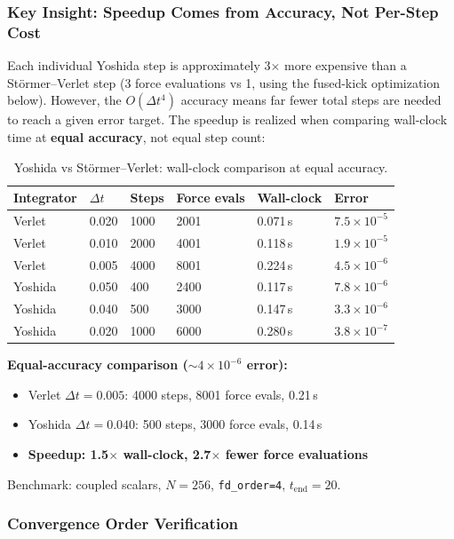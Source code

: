 \subsubsection{Key Insight: Speedup Comes from Accuracy, Not Per-Step Cost}
\label{sec:yoshida-speedup}

Each individual Yoshida step is approximately 3$\times$ more expensive than a
St\"ormer--Verlet step (3 force evaluations vs 1, using the fused-kick
optimization below). However, the $O(\Delta t^4)$ accuracy means far fewer total
steps are needed to reach a given error target. The speedup is realized
when comparing wall-clock time at \textbf{equal accuracy}, not equal step count:

\begin{table}[htbp]
\centering
\caption{Yoshida vs St\"ormer--Verlet: wall-clock comparison at equal accuracy.}
\label{tab:yoshida-benchmark}
\begin{tabular}{@{}llllll@{}}
\toprule
Integrator & $\Delta t$ & Steps & Force evals & Wall-clock & Error \\
\midrule
Verlet & 0.020 & 1000 & 2001 & 0.071\,s & $7.5 \times 10^{-5}$ \\
Verlet & 0.010 & 2000 & 4001 & 0.118\,s & $1.9 \times 10^{-5}$ \\
Verlet & 0.005 & 4000 & 8001 & 0.224\,s & $4.5 \times 10^{-6}$ \\
Yoshida & 0.050 & 400 & 2400 & 0.117\,s & $7.8 \times 10^{-6}$ \\
Yoshida & 0.040 & 500 & 3000 & 0.147\,s & $3.3 \times 10^{-6}$ \\
Yoshida & 0.020 & 1000 & 6000 & 0.280\,s & $3.8 \times 10^{-7}$ \\
\bottomrule
\end{tabular}
\end{table}

\textbf{Equal-accuracy comparison ($\sim 4 \times 10^{-6}$ error):}
\begin{itemize}
  \item Verlet $\Delta t=0.005$: 4000 steps, 8001 force evals, 0.21\,s
  \item Yoshida $\Delta t=0.040$: 500 steps, 3000 force evals, 0.14\,s
  \item \textbf{Speedup: 1.5$\times$ wall-clock, 2.7$\times$ fewer force evaluations}
\end{itemize}

Benchmark: coupled scalars, $N=256$, \texttt{fd\_order=4}, $t_\mathrm{end}=20$.

\subsubsection{Convergence Order Verification}
\label{sec:convergence-verification}

